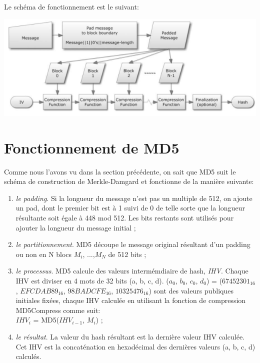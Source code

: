 \documentclass[a4paper,11pt,french]{article}
\begin{document}
Le schéma de fonctionnement est le suivant:

\includegraphics[scale=.61]{md.png}

\section{Fonctionnement de MD5}
Comme nous l'avons vu dans la section précédente, on sait que MD5 suit le schéma de construction de Merkle-Damgard et fonctionne de la manière suivante:\\
\begin{enumerate}
\item {\it{le padding}}. Si la longueur du message n'est pas un multiple de 512, on ajoute un pad, dont le premier bit est à 1 suivi de 0 de telle sorte que la longueur résultante soit égale à 448 mod 512. Les bits restants sont utilisés pour ajouter la longueur du message initial ;
\item {\it{le partitionnement}}. MD5 découpe le message original résultant d'un padding ou non en N blocs $M_{i}$, ...,$M_{N}$ de 512 bits ;
\item {\it{le processus}}. MD5 calcule des valeurs intermémdiaire de hash, {\it{IHV}}. Chaque IHV est diviser en 4 mots de 32 bits (a, b, c, d). ($a_{0}$, $b_{0}$, $c_{0}$, $d_{0}$) = ($67452301_{16}$, $EFCDAB89_{16}$, $98BADCFE_{16}$, $10325476_{16}$) sont des valeurs publiques initiales fixées,  chaque IHV calculée en utilisant la fonction de compression MD5Compress comme suit:\\ $IHV_{i}$ = MD5($IHV_{i-1}$, $M_{i}$) ;
\item {\it{le résultat}}. La valeur du hash résultant est la dernière valeur IHV calculée. Cet IHV est la concaténation en hexadécimal des dernières valeurs (a, b, c, d) calculés.
\end{enumerate}
\end{document}
